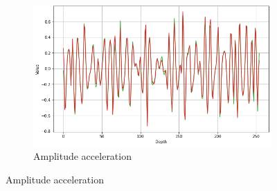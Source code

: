 \documentclass[conference]{IEEEtran}
\begin{document}
\begin{figure}[!t]
\begin{subfigure}[b]{\figcompwidth\textwidth}
        \includegraphics[width=1.0\columnwidth]{Fig/newFigs/amplitude-acceleration-trace.png}
        \caption{Amplitude acceleration}
        \label{fig:aatrace}
     \end{subfigure}
     

\end{figure}
\end{document}
